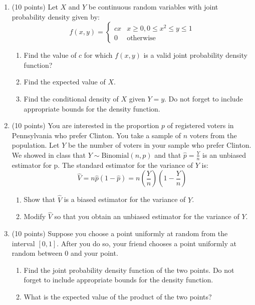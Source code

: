 \documentclass[12pt]{article}
\begin{document}
\begin{enumerate}
\item (10 points) Let $X$ and $Y$ be continuous random variables with joint probability density given by:
\[
f(x,y) = \begin{cases}
cx & x \geq 0, 0 \leq x^2 \leq y \leq 1 \\
0 & \text{otherwise}
\end{cases}
\]
\begin{enumerate}
\item Find the value of $c$ for which $f(x,y)$ is a valid joint probability density function?
\item Find the expected value of $X$.
\item Find the conditional density of $X$ given $Y = y$. Do not forget to include appropriate bounds for the density function.
\end{enumerate}

\pagebreak

\item (10 points) You are interested in the proportion $p$ of registered voters in Pennsylvania who prefer Clinton. You take a sample of $n$ voters from the population. Let $Y$ be the number of voters in your sample who prefer Clinton. We showed in class that $Y \sim \text{Binomial}(n, p)$ and that $\hat{p} = \frac{Y}{n}$ is an unbiased estimator for p. The standard estimator for the variance of $Y$ is:
\[
\hat{V} = n \hat{p}(1 - \hat{p}) = n \left( \frac{Y}{n}\right)\left(1 - \frac{Y}{n} \right)
\]
\begin{enumerate}
\item Show that $\hat{V}$ is a biased estimator for the variance of $Y$.
\item Modify $\hat{V}$ so that you obtain an unbiased estimator for the variance of $Y$.
\end{enumerate}
\pagebreak 

\item (10 points) Suppose you choose a point uniformly at random from the interval $[0, 1]$. After you do so, your friend chooses a point uniformly at random between 0 and your point.
\begin{enumerate}
\item Find the joint probability density function of the two points. Do not forget to include appropriate bounds for the density function.
\item What is the expected value of the product of the two points?
\end{enumerate}


\end{enumerate}
\end{document}
